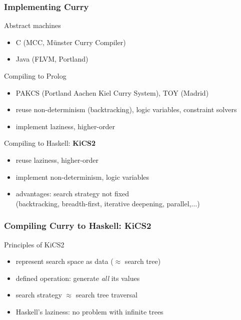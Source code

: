 \documentclass[10pt]{beamer}
\begin{document}
\begin{frame}[fragile]
\frametitle{Implementing Curry}

\begin{block}{Abstract machines}
\begin{itemize}
\item C (MCC, M\"unster Curry Compiler)
\item Java (FLVM, Portland)
\end{itemize}
\end{block}
\pause

\begin{block}{Compiling to Prolog}
\begin{itemize}
\item PAKCS (Portland Aachen Kiel Curry System), TOY (Madrid)
\item reuse non-determinism (backtracking), logic variables, constraint solvers
\item implement laziness, higher-order
\end{itemize}
\end{block}
\pause

\begin{block}{Compiling to Haskell: {\bf KiCS2} {\lgrey[WFLP'11]}}
\begin{itemize}
\item reuse laziness, higher-order
\item implement non-determinism, logic variables
\item advantages: \alert{search strategy not fixed}\\
      (backtracking, breadth-first, iterative deepening, parallel,$\ldots$)
\end{itemize}
\end{block}

\end{frame}


\begin{frame}[fragile]
\frametitle{Compiling Curry to Haskell: KiCS2}

\begin{block}{Principles of KiCS2}
\begin{itemize}\expandlist{2ex}
\item represent search space as data ($\approx$ search tree)
\item defined operation: generate \emph{all} its values
\item search strategy $\approx$ search tree traversal
\item Haskell's laziness: no problem with infinite trees
\end{itemize}
\end{block}
\end{frame}
\end{document}
